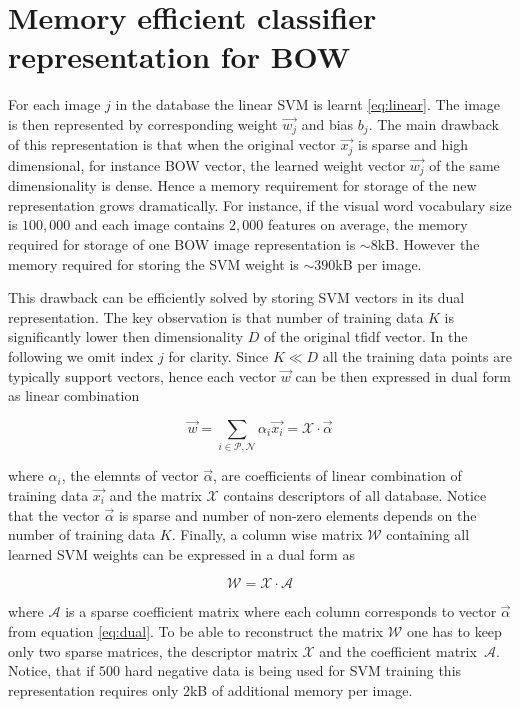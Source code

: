   \section{Memory efficient classifier representation for BOW}
  \label{sec:memory}
      For each image $j$ in the database the linear SVM is learnt \eqref{eq:linear}. The image is then represented by corresponding weight $\vec{w_j}$ and bias $b_j$. The main drawback of this representation is that when the original vector $\vec{x_j}$ is sparse and high dimensional, for instance BOW vector, the learned weight vector $\vec{w_j}$ of the same dimensionality is dense. Hence a memory requirement for storage of the new representation grows dramatically. For instance, if the visual word vocabulary size is $100,000$ and each image contains $2,000$ features on average, the memory required for storage of one BOW image representation is $\sim 8$kB. However the memory required for storing the SVM weight is $\sim390$kB per image.


      This drawback can be efficiently solved by storing SVM vectors in its dual representation. The key observation is that number of training data $K$ is significantly lower then dimensionality $D$ of the original tfidf vector. In the following we omit index $j$ for clarity. Since $K\ll D$ all the training data points are typically support vectors, hence each vector $\vec{w}$ can be then expressed in dual form as linear combination

      \begin{equation}
        \vec{w}=\sum_{i\in \mathcal{P},\mathcal{N}} \alpha_i \vec{x_i} = \mathcal{X} \cdot \vec{\alpha}
        \label{eq:dual}
      \end{equation}

      \noindent
      where $\alpha_i$, the elemnts of vector $\vec{\alpha}$, are coefficients of linear combination of training data $\vec{x_i}$ and the matrix $\mathcal{X}$ contains descriptors of all database. Notice that the vector $\vec{\alpha}$ is sparse and number of non-zero elements depends on the number of training data $K$. Finally, a column wise matrix $\mathcal{W}$ containing all learned SVM weights can be expressed in a dual form as

      \begin{equation}
        \mathcal{W} = \mathcal{X}\cdot \mathcal{A}  
      \end{equation}

      \noindent
      where $\mathcal{A}$ is a sparse coefficient matrix where each column corresponds to vector $\vec{\alpha}$ from equation \eqref{eq:dual}. To be able to reconstruct the matrix $\mathcal{W}$ one has to keep only two sparse matrices, the descriptor matrix $\mathcal{X}$ and the coefficient matrix~$\mathcal{A}$. Notice, that if $500$ hard negative data is being used for SVM training this representation requires only $2$kB of additional memory per image. 


